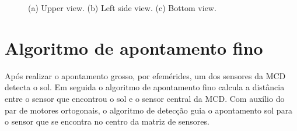 \documentclass[a4paper,12pt]{article}
\begin{document}
\begin{figure}[h]
	
	\center
	\qquad
	\qquad
	\caption{(a) Upper view. (b) Left side view. (c) Bottom view.}
	
\end{figure}
 \newpage
 \section{Algoritmo de apontamento fino}

Após realizar o apontamento grosso, por efemérides, um dos sensores da MCD detecta o sol. Em seguida o algoritmo de apontamento fino calcula a distância entre o sensor que encontrou o sol e o sensor central da MCD. Com auxílio do par de motores ortogonais, o algoritmo de detecção guia o apontamento sol para o sensor que se encontra no centro da matriz de sensores.
\end{document}
